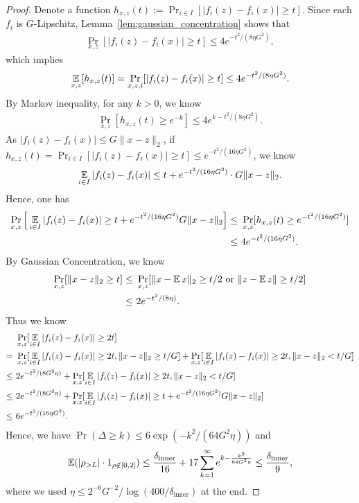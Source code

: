 \begin{proof}
Denote a function $h_{x,z}(t):=\Pr_{i\in I}[|f_i(z)-f_i(x)|\ge t]$.
Since each $f_i$ is $G$-Lipschitz, Lemma~\ref{lem:gaussian_concentration} shows that
\begin{align*}
    \Pr_{x,z}[|f_i(z)-f_i(x)|\geq t]\leq 4e^{-t^2/(8\eta G^2)},
\end{align*}
which implies 
\begin{align*}
    \operatorname*{\mathbb{E}}_{x,z}[h_{x,z}(t)] = \Pr_{x,z,i}[|f_i(z)-f_i(x)|\geq t]\leq 4e^{-t^2/(8\eta G^2)}.
\end{align*}
By Markov inequality, for any $k>0$, we know
\begin{align*}
    \Pr_{x,z}[h_{x,z}(t)\geq e^{-k}]\leq 4e^{k-t^2/(8\eta G^2)}.
\end{align*}
As $|f_i(z)-f_i(x)|\leq G\|x-z\|_2$, if $h_{x,z}(t)=\Pr_{i\in I}[|f_i(z)-f_i(x)|\ge t]\leq e^{-t^2/(16\eta G^2)}$, we know $$\operatorname*{\mathbb{E}}_{i\in I}|f_i(z)-f_i(x)|\leq t +e^{-t^2/(16\eta G^2)}\cdot G\|x-z\|_2.$$
Hence, one has
\begin{align*}
     \Pr_{x,z}\Big[\operatorname*{\mathbb{E}}_{i\in I}|f_i(z)-f_i(x)|\ge t+e^{-t^2/(16\eta G^2)}G\|x-z\|_2 \Big]
    \leq &~ \Pr_{x,z}[h_{x,z}(t)\ge e^{-t^2/(16\eta G^2)}]\\
    \leq & ~ 4e^{-t^2/(16\eta G^2)}.
\end{align*}
By Gaussian Concentration, we know
\begin{align*}
    \Pr_{x,z}[\|x-z\|_2\ge t]
    \leq &~ \Pr_{x,z}[\|x-\operatorname*{\mathbb{E}} x\|_2\ge t/2 \text{ or }\|z-\operatorname*{\mathbb{E}} z\|\ge t/2]\\
    \leq & ~ 2e^{-t^2/(8\eta)}.
\end{align*}
Thus we know
\begin{align*}
    &~ \Pr_{x,z}[\operatorname*{\mathbb{E}}_{i\in I}|f_i(z)-f_i(x)|\ge 2t]\\
    =& ~\Pr_{x,z}[\operatorname*{\mathbb{E}}_{i\in I}|f_i(z)-f_i(x)|\ge 2t, \|x-z\|_2\ge t/G]+\Pr_{x,z}[\operatorname*{\mathbb{E}}_{i\in I}|f_i(z)-f_i(x)|\geq 2t,\|x-z\|_2<t/G]\\
    \leq & ~2e^{-t^2/(8G^2\eta)}+\Pr_{x,z}[\operatorname*{\mathbb{E}}_{i\in I}|f_i(z)-f_i(x)|\geq 2t,\|x-z\|_2<t/G]\\
    \leq &~  2e^{-t^2/(8G^2\eta)} +\Pr_{x,z}[\operatorname*{\mathbb{E}}_{i\in I}|f_i(z)-f_i(x)|\ge t+e^{-t^2/(16\eta G^2)}G\|x-z\|_2]\\
    \leq & ~ 6e^{-t^2/(16\eta G^2)}.
\end{align*}
Hence, we have $\Pr(\Delta\geq k)\leq 6\exp(-k^{2}/(64G^{2}\eta))$ and 
\begin{equation}
\operatorname*{\mathbb{E}}(|\rho_{>L}|\cdot1_{\rho \notin [0,2]})\leq\frac{\delta_{\mathrm{inner}}}{16}+17\sum_{k=1}^{\infty}e^{k-\frac{k^{2}}{64G^{2}\eta}} \leq\frac{\delta_{\mathrm{inner}}}{9},\label{eq:dTv3}
\end{equation}
where we used $\eta\leq2^{-6}G^{-2}/\log(400/\delta_{\mathrm{inner}})$ at the end.


\end{proof}
